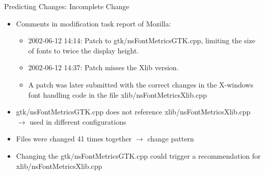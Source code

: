 
\begin{frame}{Predicting Changes: Incomplete Change}
  \begin{itemize}
  \item Comments in modification task report of Mozilla:
    \begin{itemize}
    \item 2002-06-12 14:14: Patch to gtk/nsFontMetricsGTK.cpp,
      limiting the size of fonts to twice the display height.
    \item 2002-06-12 14:37: Patch misses the Xlib version.
    \item A patch was later submitted with the correct changes in the
      X-windows font handling code in the file
      xlib/nsFontMetricsXlib.cpp
    \end{itemize}
  \item gtk/nsFontMetricsGTK.cpp does not reference
    xlib/nsFontMetricsXlib.cpp $\rightarrow$ used in different
    configurations
  \item Files were changed 41 times together $\rightarrow$ change
    pattern
  \item Changing the gtk/nsFontMetricsGTK.cpp could trigger a
    recommendation for xlib/nsFontMetricsXlib.cpp
  \end{itemize}
\end{frame}

